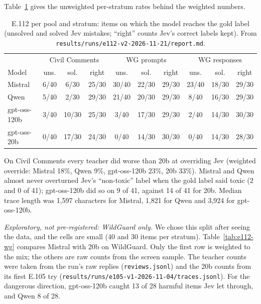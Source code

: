 \documentclass[11pt]{article}
\renewcommand{\_}{\origunderscore\allowbreak}
\begin{document}
Table~\ref{tab:e112-strata} gives the unweighted per-stratum rates behind the weighted numbers.

\begin{table}[H]
\centering
\small
\begin{tabular}{@{}l ccc ccc ccc@{}}
\toprule
 & \multicolumn{3}{c}{Civil Comments} & \multicolumn{3}{c}{WG prompts} & \multicolumn{3}{c}{WG responses} \\
Model & uns. & sol. & right & uns. & sol. & right & uns. & sol. & right \\
\midrule
Mistral & 6/40 & 6/30 & 25/30 & 30/40 & 22/30 & 29/30 & 23/40 & 18/30 & 29/30 \\
Qwen & 5/40 & 2/30 & 29/30 & 21/40 & 20/30 & 29/30 & 8/40 & 16/30 & 29/30 \\
gpt-oss-120b & 3/40 & 10/30 & 25/30 & 3/40 & 17/30 & 29/30 & 2/40 & 14/30 & 30/30 \\
gpt-oss-20b & 0/40 & 17/30 & 24/30 & 0/40 & 14/30 & 30/30 & 0/40 & 14/30 & 28/30 \\
\bottomrule
\end{tabular}
\caption{E.112 per pool and stratum: items on which the model reaches the gold label (unsolved and solved Jev mistakes; ``right'' counts Jev's correct labels kept). From \texttt{results/runs/e112-v2-2026-11-21/report.md}.}
\label{tab:e112-strata}
\end{table}

On Civil Comments every teacher did worse than 20b at overriding Jev (weighted override: Mistral 18\%, Qwen 9\%, gpt-oss-120b 23\%, 20b 33\%). Mistral and Qwen almost never overturned Jev's ``non-toxic'' label when the gold label said toxic (2 and 0 of 41); gpt-oss-120b did so on 9 of 41, against 14 of 41 for 20b. Median trace length was 1,597 characters for Mistral, 1,821 for Qwen and 3,924 for gpt-oss-120b.

\emph{Exploratory, not pre-registered: WildGuard only.} We chose this split after seeing the data, and the cells are small (40 and 30 items per stratum). Table~\ref{tab:e112-wg} compares Mistral with 20b on WildGuard. Only the first row is weighted to the mix; the others are raw counts from the screen sample. The teacher counts were taken from the run's raw replies (\texttt{reviews.jsonl}) and the 20b counts from its first E.105 try (\texttt{results/runs/e105-v1-2026-11-04/traces.jsonl}). For the dangerous direction, gpt-oss-120b caught 13 of 28 harmful items Jev let through, and Qwen 8 of 28.
\end{document}
